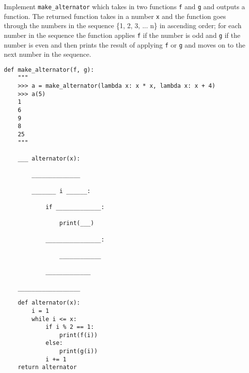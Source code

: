 \begin{blocksection}
\question Implement \lstinline$make_alternator$ which takes in two functions \texttt{f} and \texttt{g} and outputs a function. The returned function takes in a number \texttt{x} and the function goes through the numbers in the sequence \{1, 2, 3, ... n\} in ascending order; for each number in the sequence the function applies \texttt{f} if the number is odd and \texttt{g} if the number is even and then prints the result of applying \texttt{f} or \texttt{g} and moves on to the next number in the sequence.  

\begin{lstlisting}
def make_alternator(f, g):
    """
    >>> a = make_alternator(lambda x: x * x, lambda x: x + 4)
    >>> a(5)
    1
    6
    9
    8
    25
    """

    ___ alternator(x):

        ______________

        _______ i ______:

            if _____________:

                print(___)

            ________________:

                ____________

            _____________

    __________________

\end{lstlisting}

\begin{solution}[1.5in]
\begin{lstlisting}
    def alternator(x):
        i = 1
        while i <= x:
            if i % 2 == 1:
                print(f(i))
            else:
                print(g(i))
            i += 1
    return alternator
\end{lstlisting}
\end{solution}

\end{blocksection}